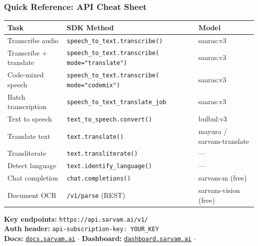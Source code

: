 \begin{frame}[fragile]\frametitle{Quick Reference: API Cheat Sheet}
\begin{center}
\begin{tabular}{|p{3cm}|p{4.5cm}|p{2.5cm}|}
\hline
\textbf{Task} & \textbf{SDK Method} & \textbf{Model} \\
\hline
Transcribe audio & \texttt{speech\_to\_text.transcribe()} & saaras:v3 \\
Transcribe + translate & \texttt{speech\_to\_text.transcribe( mode="translate")} & saaras:v3 \\
Code-mixed speech & \texttt{speech\_to\_text.transcribe( mode="codemix")} & saaras:v3 \\
Batch transcription & \texttt{speech\_to\_text\_translate\_job} & saaras:v3 \\
Text to speech & \texttt{text\_to\_speech.convert()} & bulbul:v3 \\
Translate text & \texttt{text.translate()} & mayura / sarvam-translate \\
Transliterate & \texttt{text.transliterate()} & --- \\
Detect language & \texttt{text.identify\_language()} & --- \\
Chat completion & \texttt{chat.completions()} & sarvam-m (free) \\
Document OCR & \texttt{/v1/parse} (REST) & sarvam-vision (free) \\
\hline
\end{tabular}
\end{center}

\textbf{Key endpoints:} \texttt{https://api.sarvam.ai/v1/}\\
\textbf{Auth header:} \texttt{api-subscription-key: YOUR\_KEY}\\
\textbf{Docs:} \href{https://docs.sarvam.ai}{\texttt{docs.sarvam.ai}} $\cdot$
\textbf{Dashboard:} \href{https://dashboard.sarvam.ai}{\texttt{dashboard.sarvam.ai}} $\cdot$
\end{frame}

